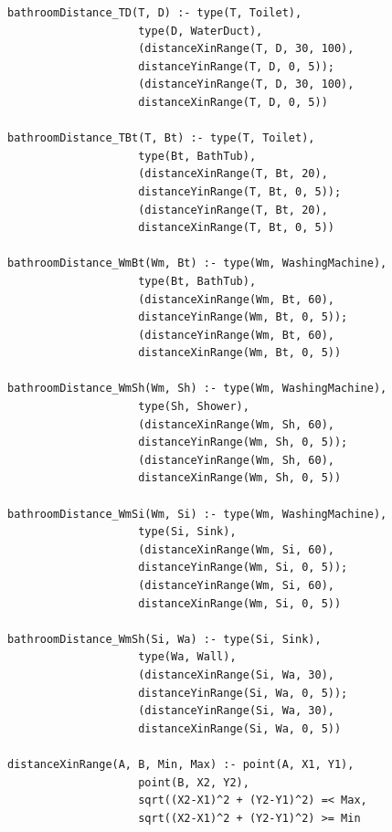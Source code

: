 \documentclass[runningheads]{llncs}
\begin{document}
\begin{footnotesize}
\begin{verbatim}
bathroomDistance_TD(T, D) :- type(T, Toilet),
			        type(D, WaterDuct),
			        (distanceXinRange(T, D, 30, 100),
			        distanceYinRange(T, D, 0, 5));
			        (distanceYinRange(T, D, 30, 100),
			        distanceXinRange(T, D, 0, 5))
			      
bathroomDistance_TBt(T, Bt) :- type(T, Toilet),
			        type(Bt, BathTub),
			        (distanceXinRange(T, Bt, 20),
			        distanceYinRange(T, Bt, 0, 5));
			        (distanceYinRange(T, Bt, 20),
			        distanceXinRange(T, Bt, 0, 5))
			      
bathroomDistance_WmBt(Wm, Bt) :- type(Wm, WashingMachine),
			        type(Bt, BathTub),
			        (distanceXinRange(Wm, Bt, 60),
			        distanceYinRange(Wm, Bt, 0, 5));
			        (distanceYinRange(Wm, Bt, 60),
			        distanceXinRange(Wm, Bt, 0, 5))

bathroomDistance_WmSh(Wm, Sh) :- type(Wm, WashingMachine),
			        type(Sh, Shower),
			        (distanceXinRange(Wm, Sh, 60),
			        distanceYinRange(Wm, Sh, 0, 5));
			        (distanceYinRange(Wm, Sh, 60),
			        distanceXinRange(Wm, Sh, 0, 5))
			      
bathroomDistance_WmSi(Wm, Si) :- type(Wm, WashingMachine),
			        type(Si, Sink),
			        (distanceXinRange(Wm, Si, 60),
			        distanceYinRange(Wm, Si, 0, 5));
			        (distanceYinRange(Wm, Si, 60),
			        distanceXinRange(Wm, Si, 0, 5))	
			        
bathroomDistance_WmSh(Si, Wa) :- type(Si, Sink),
			        type(Wa, Wall),
			        (distanceXinRange(Si, Wa, 30),
			        distanceYinRange(Si, Wa, 0, 5));
			        (distanceYinRange(Si, Wa, 30),
			        distanceXinRange(Si, Wa, 0, 5))

distanceXinRange(A, B, Min, Max) :- point(A, X1, Y1),
			        point(B, X2, Y2),
			        sqrt((X2-X1)^2 + (Y2-Y1)^2) =< Max,
			        sqrt((X2-X1)^2 + (Y2-Y1)^2) >= Min
\end{verbatim}
\end{footnotesize}
\end{document}

